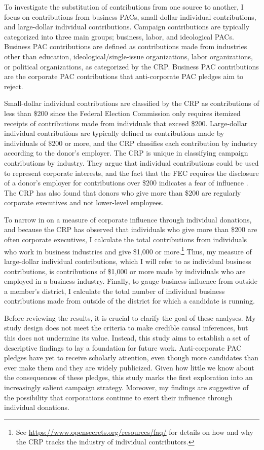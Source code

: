 \documentclass[12pt]{article}
\begin{document}
To investigate the substitution of contributions from one source to another, I focus on contributions from business PACs, small-dollar individual contributions, and large-dollar individual contributions. Campaign contributions are typically categorized into three main groups; business, labor, and ideological PACs. Business PAC contributions are defined as contributions made from industries other than education, ideological/single-issue organizations, labor organizations, or political organizations, as categorized by the CRP. Business PAC contributions are the corporate PAC contributions that anti-corporate PAC pledges aim to reject.   

Small-dollar individual contributions are classified by the CRP as contributions of less than \$200 since the Federal Election Commission only requires itemized receipts of contributions made from individuals that exceed \$200. Large-dollar individual contributions are typically defined as contributions made by individuals of \$200 or more, and the CRP classifies each contribution by industry according to the donor's employer. The CRP is unique in classifying campaign contributions by industry. They argue that individual contributions could be used to represent corporate interests, and the fact that the FEC requires the disclosure of a donor's employer for contributions over \$200 indicates a fear of influence \citep{opensecrets.orga}. The CRP has also found that donors who give more than \$200 are regularly corporate executives and not lower-level employees. 

To narrow in on a measure of corporate influence through individual donations, and because the CRP has observed that individuals who give more than \$200 are often corporate executives, I calculate the total contributions from individuals who work in business industries and give \$1,000 or more.\footnote{See \href{https://www.opensecrets.org/resources/faq/}{https://www.opensecrets.org/resources/faq/} for details on how and why the CRP tracks the industry of individual contributors.} Thus, my measure of large-dollar individual contributions, which I will refer to as individual business contributions, is contributions of \$1,000 or more made by individuals who are employed in a business industry. Finally, to gauge business influence from outside a member's district, I calculate the total number of individual business contributions made from outside of the district for which a candidate is running.  

Before reviewing the results, it is crucial to clarify the goal of these analyses. My study design does not meet the criteria to make credible causal inferences, but this does not undermine its value. Instead, this study aims to establish a set of descriptive findings to lay a foundation for future work. Anti-corporate PAC pledges have yet to receive scholarly attention, even though more candidates than ever make them and they are widely publicized. Given how little we know about the consequences of these pledges, this study marks the first exploration into an increasingly salient campaign strategy. Moreover, my findings are suggestive of the possibility that corporations continue to exert their influence through individual donations.
\end{document}
